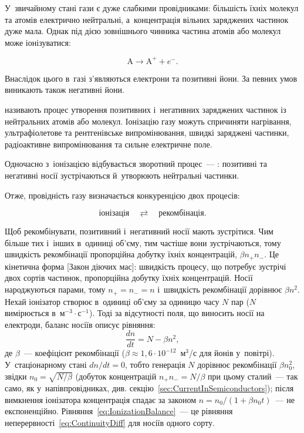У~звичайному стані гази є дуже слабкими провідниками: більшість їхніх молекул та атомів
електрично нейтральні, а~концентрація вільних заряджених частинок дуже мала. Однак під
дією зовнішнього чинника частина атомів або молекул може іонізуватися:

\begin{equation*}
	\mathrm{A}\longrightarrow \mathrm{A}^+ + e^-.
\end{equation*}

Внаслідок цього в~газі з'являються електрони та позитивні йони. За певних умов виникають
також негативні йони.

 називають процес утворення позитивних і~негативних заряджених частинок
із нейтральних атомів або молекул. Іонізацію газу можуть спричиняти нагрівання,
ультрафіолетове та рентгенівське випромінювання, швидкі заряджені частинки, радіоактивне
випромінювання та сильне електричне поле.

Одночасно з~іонізацією відбувається зворотний процес~--- : позитивні
та негативні носії зустрічаються й~утворюють нейтральні частинки.

Отже, провідність газу визначається конкуренцією двох процесів:

\begin{equation*}
	\text{іонізація}\quad\rightleftarrows\quad\text{рекомбінація}.
\end{equation*}

Щоб рекомбінувати, позитивний і~негативний носії мають зустрітися. Чим більше тих і~інших
в~одиниці об'єму, тим частіше вони зустрічаються, тому швидкість рекомбінації пропорційна
добутку їхніх концентрацій, $\beta n_+n_-$. Це кінетична форма [Закон діючих мас]:
швидкість процесу, що потребує зустрічі двох сортів частинок, пропорційна добутку їхніх
концентрацій. Носії народжуються парами, тому $n_+=n_-=n$ і~швидкість рекомбінації
дорівнює $\beta n^2$. Нехай іонізатор створює в~одиниці об'єму за одиницю часу $N$ пар
($N$ вимірюється в~м$^{-3}\cdot$с$^{-1}$). Тоді за відсутності поля, що виносить носії на
електроди, баланс носіїв описує рівняння:
\begin{equation}\label{eq:IonizationBalance}
	\frac{dn}{dt} = N - \beta n^2,
\end{equation}
де $\beta$~--- коефіцієнт рекомбінації ($\beta\approx1{,}6\cdot10^{-12}$~м$^3$/с для йонів
у~повітрі). У~стаціонарному стані $dn/dt=0$, тобто генерація $N$ дорівнює рекомбінації
$\beta n_0^2$, звідки $n_0=\sqrt{N/\beta}$ (добуток концентрацій $n_+n_-=N/\beta$ при
цьому сталий~--- так само, як у~напівпровідниках, див.
секцію~\ref{sec:CurrentInSemiconductors}); після вимкнення іонізатора концентрація спадає
за законом $n=n_0/(1+\beta n_0t)$~--- не експоненційно.
Рівняння~\eqref{eq:IonizationBalance}~--- це рівняння
неперервності~\eqref{eq:ContinuityDiff} для носіїв одного сорту.


